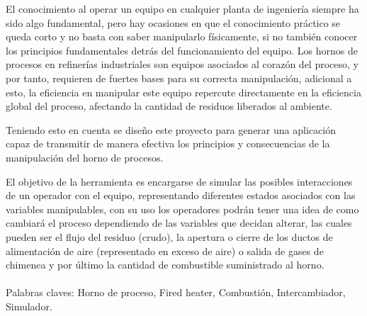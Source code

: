 \documentclass[pregrado]{tesis-usb}
\begin{document}
\frontmatter
\maketitle


\begin{resumen}
     El conocimiento al operar un equipo en cualquier planta de ingeniería siempre ha sido algo fundamental, pero hay ocasiones en que el conocimiento práctico se queda corto y no basta con saber manipularlo físicamente, si no también conocer los principios fundamentales detrás del funcionamiento del equipo. Los hornos de procesos en refinerías industriales son equipos asociados al corazón del proceso, y por tanto, requieren de fuertes bases para su correcta manipulación, adicional a esto, la eficiencia en manipular este equipo repercute directamente en la eficiencia global del proceso, afectando la cantidad de residuos liberados al ambiente.
     
     Teniendo esto en cuenta se diseño este proyecto para generar una aplicación capaz de transmitir de manera efectiva los principios y consecuencias de la manipulación del horno de procesos. 
     
     El objetivo de la herramienta es encargarse de simular las posibles interacciones de un operador con el equipo, representando diferentes estados asociados con las variables manipulables, con su uso los operadores podrán tener una idea de como cambiará el proceso dependiendo de las variables que decidan alterar, las cuales pueden ser el flujo del residuo (crudo), la apertura o cierre de los ductos de alimentación de aire (representado en exceso de aire) o salida de gases de chimenea y por último la cantidad de combustible suministrado al horno.\\
     \vspace{15pt}\\
     Palabras claves: Horno de proceso, Fired heater, Combustión, Intercambiador, Simulador.
\end{resumen}
\tableofcontents
\listoffigures
\useacronyms
%

\mainmatter





%

\nocite{*}

\appendix

%
\end{document}
